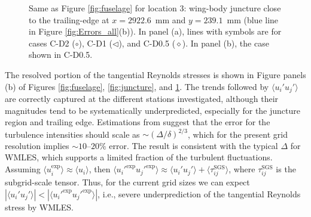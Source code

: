 \documentclass{ctr}
\begin{document}
\begin{figure}
\begin{center}
\hspace{0.5cm}
\end{center}
\caption{Same as Figure \ref{fig:fuselage} for location 3: wing-body
  juncture close to the trailing-edge at $x=2922.6$~mm and $y=239.1$~mm
  (blue line in Figure \ref{fig:Errors_all}(b)). In panel (a), lines
  with symbols are for cases C-D2 ($\circ$), C-D1 ($\triangleleft$),
  and C-D0.5 ($\diamond$). In panel (b), the case shown in
  C-D0.5.\label{fig:separation}}
\end{figure}

The resolved portion of the tangential Reynolds stresses is shown in
Figure panels (b) of Figures \ref{fig:fuselage}, \ref{fig:juncture},
and \ref{fig:separation}.  The trends followed by $\langle u_i'
u_j'\rangle$ are correctly captured at the different stations
investigated, although their magnitudes tend to be systematically
underpredicted, especially for the juncture region and trailing edge.
Estimations from \cite{Lozano2019a} suggest that the error for the
turbulence intensities should scale as $\sim (\Delta/\delta)^{2/3}$,
which for the present grid resolution implies $\sim10$--$20\%$
error. The result is consistent with the typical $\Delta$ for WMLES,
which supports a limited fraction of the turbulent fluctuations.
Assuming $\langle u_i^\mathrm{exp} \rangle \approx \langle
u_i\rangle$, then $\langle {u_i'}^\mathrm{exp}
{u_j'}^\mathrm{exp}\rangle \approx \langle u_i' u_j'\rangle + \langle
\tau_{ij}^\mathrm{SGS}\rangle$, where $\tau_{ij}^\mathrm{SGS}$ is the
subgrid-scale tensor.  Thus, for the current grid sizes we can expect
$|\langle u_i' u_j'\rangle| < |\langle {u_i'}^\mathrm{exp}
{u_j'}^\mathrm{exp}\rangle|$, i.e., severe underprediction of the
tangential Reynolds stress by WMLES.
\end{document}
